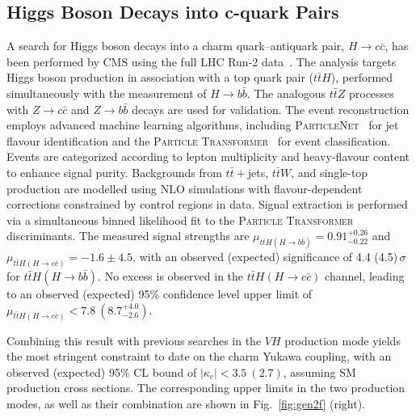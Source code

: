 \documentclass[a4paper,11pt]{article}
\begin{document}
\subsection{Higgs Boson Decays into c-quark Pairs}

A search for Higgs boson decays into a charm quark--antiquark pair,
$H\to c\bar{c}$, has been performed by CMS using the full LHC Run-2
data~\cite{tthcc-cms}. The analysis targets Higgs boson production in
association with a top quark pair ($t\bar{t}H$), performed
simultaneously with the measurement of $H\to b\bar{b}$. The analogous
$t\bar{t}Z$ processes with $Z\to c\bar{c}$ and $Z\to b\bar{b}$ decays
are used for validation. The event reconstruction employs advanced
machine learning algorithms, including
\textsc{ParticleNet}~\cite{pnet} for jet flavour identification and
the \textsc{Particle Transformer}~\cite{ptran} for event
classification. Events are categorized according to lepton
multiplicity and heavy-flavour content to enhance signal purity.
%
Backgrounds from $t\bar{t}+$jets, $t\bar{t}W$, and single-top
production are modelled using NLO simulations with flavour-dependent
corrections constrained by control regions in data. Signal extraction
is performed via a simultaneous binned likelihood fit to the
\textsc{Particle Transformer} discriminants. The measured signal
strengths are $\mu_{t\bar{t}H(H\to b\bar{b})}=0.91^{+0.26}_{-0.22}$
and $\mu_{t\bar{t}H(H\to c\bar{c})}=-1.6\pm4.5$, with an observed
(expected) significance of 4.4 (4.5)\,$\sigma$ for $t\bar{t}H(H\to
b\bar{b})$. No excess is observed in the $t\bar{t}H(H\to c\bar{c})$
channel, leading to an observed (expected) 95\% confidence level upper
limit of $\mu_{t\bar{t}H(H\to c\bar{c})}<7.8~(8.7^{+4.0}_{-2.6})$.

Combining this result with previous searches in the $VH$ production
mode yields the most stringent constraint to date on the charm Yukawa
coupling, with an observed (expected) 95\% CL bound of
$|\kappa_c|<3.5~(2.7)$, assuming SM production cross sections. The
corresponding upper limits in the two production modes, as well as
their combination are shown in Fig.~\ref{fig:gen2f} (right).
\end{document}
